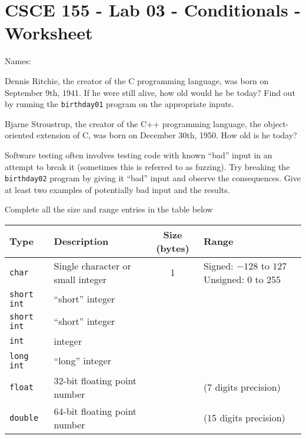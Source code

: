 \documentclass[12pt]{exam}
\begin{document}
\section*{CSCE 155 - Lab 03 - Conditionals - Worksheet}

Names: \underline{\hspace{10cm}}

\begin{questions}

\question Dennis Ritchie, the creator of the C programming language, 
was born on September 9th, 1941.  If he were still alive, how old 
would he be today?  Find out by running the \texttt{birthday01} 
program on the appropriate inputs.

\begin{solution}[1cm]
\end{solution}

\question Bjarne Stroustrup, the creator of the C++ programming 
language, the object-oriented extension of C, was born on December 
30th, 1950.  How old is he today? 

\begin{solution}[1cm]
\end{solution}

\question Software testing often involves testing code with known 
``bad'' input in an attempt to break it (sometimes this is referred
to as fuzzing).  Try breaking the \texttt{birthday02} 
program by giving it ``bad'' input and observe the consequences.  
Give at least two examples of potentially bad input and the results.

\begin{solution}[1cm]
\end{solution}

\question Complete all the size and range entries in the table below
\begin{table}[h]
\centering
\begin{tabular}{|l|l|c|p{4cm}|}
\hline
Type & Description & Size (bytes) & Range \\
\hline\hline
\texttt{char} & Single character or small integer & 1 & 
 Signed: $-128$ to $127$
 Unsigned: 0 to 255 \\
\hline
\texttt{short int} & ``short'' integer & ~ &  \vspace{1cm}\\
\hline
\texttt{short int} & ``short'' integer & ~ &  \vspace{1cm}\\
\hline
\texttt{int} & integer & ~ &  \vspace{1cm}\\
\hline
\texttt{long int} & ``long'' integer & ~ &  \vspace{1cm}\\
\hline
\texttt{float} & 32-bit floating point number & ~ & (7 digits precision)\\
\hline
\texttt{double} & 64-bit floating point number & ~ & (15 digits precision)\\
\hline
\end{tabular}
\end{table}


\end{questions}
\end{document}

